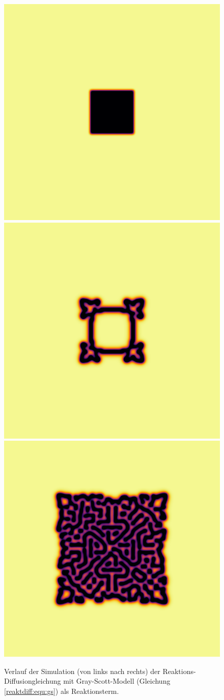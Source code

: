 \begin{figure}
    \centering
    \includegraphics[width=0.32\linewidth]{papers/reaktdiff/images/GrayScott/gs_n1.png}
    \includegraphics[width=0.32\linewidth]{papers/reaktdiff/images/GrayScott/gs_n300.png}
    \includegraphics[width=0.32\linewidth]{papers/reaktdiff/images/GrayScott/gs_n999.png}
    \caption{Verlauf der Simulation (von links nach rechts) der Reaktions-Diffusiongleichung mit Gray-Scott-Modell (Gleichung \eqref{reaktdiff:equ:gs}) als Reaktionsterm.}
    \label{reaktdiff:fig:gs}
\end{figure}
